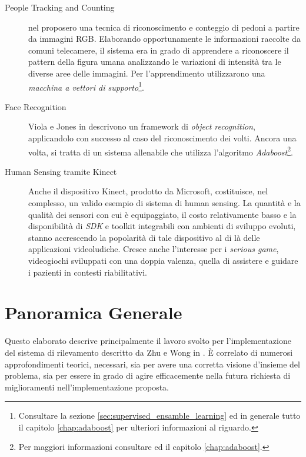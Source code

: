             \begin{description}
                \item[People Tracking and Counting] \citet{Papageorgiou98} nel \citeyear{Papageorgiou98} proposero una tecnica di riconoscimento e conteggio di pedoni a partire da immagini RGB.
                Elaborando opportunamente le informazioni raccolte da comuni telecamere, il sistema era in grado di apprendere a riconoscere il pattern della figura umana analizzando le variazioni di intensità tra le diverse aree delle immagini.
                Per l'apprendimento utilizzarono una \emph{macchina a vettori di supporto}\footnote{Consultare la sezione \ref{sec:supervised_ensamble_learning} ed in generale tutto il capitolo \ref{chap:adaboost} per ulteriori informazioni al riguardo.}.
                
                \item[Face Recognition] Viola e Jones in \cite{Viola04} descrivono un framework di \emph{object recognition}, applicandolo con successo al caso del riconoscimento dei volti.
                Ancora una volta, si tratta di un sistema allenabile che utilizza l'algoritmo \emph{Adaboost}\footnote{Per maggiori informazioni consultare \cite{Freund97} ed il capitolo \ref{chap:adaboost}.}.

                \item[Human Sensing tramite Kinect] Anche il dispositivo Kinect, prodotto da Microsoft, costituisce, nel complesso, un valido esempio di sistema di human sensing.
                La quantità e la qualità dei sensori con cui è equipaggiato, il costo relativamente basso e la disponibilità di \emph{SDK} e toolkit integrabili con ambienti di sviluppo evoluti, stanno accrescendo la popolarità di tale dispositivo al di là delle applicazioni videoludiche.
                Cresce anche l'interesse per i \emph{serious game}, videogiochi sviluppati con una doppia valenza, quella di assistere e guidare i pazienti in contesti riabilitativi.
            \end{description}

    \section{Panoramica Generale}
    \label{sec:overview}
        Questo elaborato descrive principalmente il lavoro svolto per l'implementazione del sistema di rilevamento descritto da Zhu e Wong in \cite{Zhu13}.
        È correlato di numerosi approfondimenti teorici, necessari, sia per avere una corretta visione d'insieme del problema, sia per essere in grado di agire efficacemente nella futura richiesta di miglioramenti nell'implementazione proposta.


